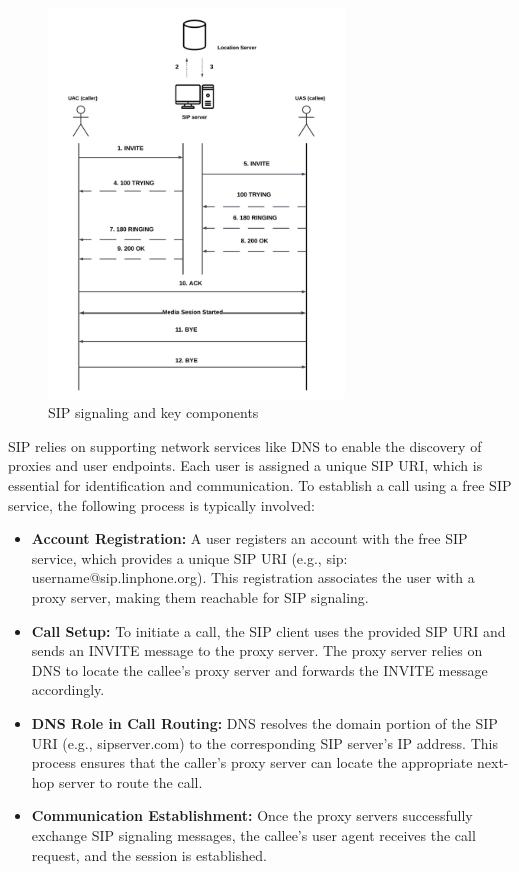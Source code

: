     \begin{figure}[H]
        \centering
        \includegraphics[width=0.7\textwidth]{image/Call Initiation.pdf} 
        \caption{SIP signaling and key components}
        \label{fig:sip_signaling}
    \end{figure}
    
    SIP relies on supporting network services like DNS to enable the discovery of proxies and user endpoints. 
    Each user is assigned a unique SIP URI, which is essential for identification and communication. 
    To establish a call using a free SIP service, the following process is typically involved:

    \begin{itemize}
        \item \textbf{Account Registration:} A user registers an account with the free SIP service, which provides a unique SIP URI (e.g., sip: username@sip.linphone.org). 
        This registration associates the user with a proxy server, making them reachable for SIP signaling.
        \item \textbf{Call Setup:} To initiate a call, the SIP client uses the provided SIP URI and sends an INVITE message to the proxy server. 
        The proxy server relies on DNS to locate the callee's proxy server and forwards the INVITE message accordingly.
        \item \textbf{DNS Role in Call Routing:} DNS resolves the domain portion of the SIP URI (e.g., sipserver.com) to the corresponding SIP server's IP address. 
        This process ensures that the caller's proxy server can locate the appropriate next-hop server to route the call.
        \item \textbf{Communication Establishment:}  Once the proxy servers successfully exchange SIP signaling messages, the callee's user agent receives the call request, and the session is established.
    \end{itemize}

